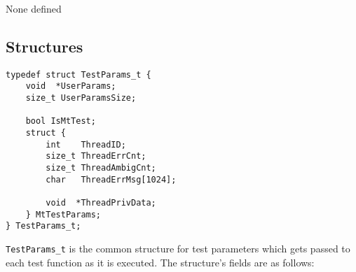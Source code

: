 \documentclass[../HDF5_RFC.tex]{subfiles}
\begin{document}
None defined

\subsection{Structures}

\begin{verbatim}
typedef struct TestParams_t {
    void  *UserParams;
    size_t UserParamsSize;

    bool IsMtTest;
    struct {
        int    ThreadID;
        size_t ThreadErrCnt;
        size_t ThreadAmbigCnt;
        char   ThreadErrMsg[1024];

        void  *ThreadPrivData;
    } MtTestParams;
} TestParams_t;
\end{verbatim}

\texttt{TestParams\_t} is the common structure for test parameters which gets passed to each test
function as it is executed. The structure's fields are as follows:
\end{document}
